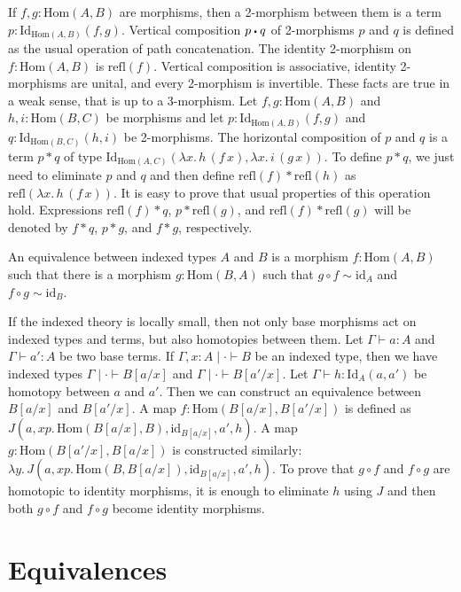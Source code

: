 \documentclass[reqno]{amsart}
\theoremstyle{definition}
\theoremstyle{remark}
\newcommand{\ob}{}
\newcommand{\fs}[1]{\mathrm{#1}}
\newcommand{\Hom}{\fs{Hom}}
\newcommand{\Id}{\fs{Id}}
\newcommand{\refl}{\fs{refl}}
\newcommand{\id}{\fs{id}}
\numberwithin{figure}{section}
\newcommand{\ct}{%
  \mathchoice{\mathbin{\raisebox{0.25ex}{$\displaystyle\centerdot$}}}%
             {\mathbin{\raisebox{0.25ex}{$\centerdot$}}}%
             {\mathbin{\raisebox{0.25ex}{$\scriptstyle\,\centerdot\,$}}}%
             {\mathbin{\raisebox{0.25ex}{$\scriptscriptstyle\,\centerdot\,$}}}
}
\begin{document}
If $f,g : \Hom(A,B)$ are morphisms, then a 2-morphism between them is a term $p : \Id_{\Hom(A,B)}(f,g)$.
Vertical composition $p \ct q$ of 2-morphisms $p$ and $q$ is defined as the usual operation of path concatenation.
The identity 2-morphism on $f : \Hom(A,B)$ is $\refl(f)$.
Vertical composition is associative, identity 2-morphisms are unital, and every 2-morphism is invertible.
These facts are true in a weak sense, that is up to a 3-morphism.
Let $f,g : \Hom(A,B)$ and $h,i : \Hom(B,C)$ be morphisms and let $p : \Id_{\Hom(A,B)}(f,g)$ and $q : \Id_{\Hom(B,C)}(h,i)$ be 2-morphisms.
The horizontal composition of $p$ and $q$ is a term $p * q$ of type $\Id_{\Hom(A,C)}(\lambda x.\,h\,(f\,x), \lambda x.\,i\,(g\,x))$.
To define $p * q$, we just need to eliminate $p$ and $q$ and then define $\refl(f) * \refl(h)$ as $\refl(\lambda x.\,h\,(f\,x))$.
It is easy to prove that usual properties of this operation hold.
Expressions $\refl(f) * q$, $p * \refl(g)$, and $\refl(f) * \refl(g)$ will be denoted by $f * q$, $p * g$, and $f * g$, respectively.

\begin{defn}
An equivalence between indexed types $A$ and $B$ is a morphism $f : \Hom(A,B)$ such that there is a morphism $g : \Hom(B,A)$ such that $g \circ f \sim \id_A$ and $f \circ g \sim \id_B$.
\end{defn}

If the indexed theory is locally small, then not only base morphisms act on indexed types and terms, but also homotopies between them.
Let $\Gamma \vdash a : A$ and $\Gamma \vdash a' : A$ be two base terms.
If $\Gamma, x : A \mid \cdot \vdash B \ob$ be an indexed type, then we have indexed types $\Gamma \mid \cdot \vdash B[a/x] \ob$ and $\Gamma \mid \cdot \vdash B[a'/x] \ob$.
Let $\Gamma \vdash h : \Id_A(a,a')$ be homotopy between $a$ and $a'$.
Then we can construct an equivalence between $B[a/x]$ and $B[a'/x]$.
A map $f : \Hom(B[a/x],B[a'/x])$ is defined as $J(a, x p.\,\Hom(B[a/x],B), \id_{B[a/x]}, a', h)$.
A map $g : \Hom(B[a'/x],B[a/x])$ is constructed similarly: $\lambda y.\,J(a, x p.\,\Hom(B,B[a/x]), \id_{B[a/x]}, a', h)$.
To prove that $g \circ f$ and $f \circ g$ are homotopic to identity morphisms, it is enough to eliminate $h$ using $J$ and then both $g \circ f$ and $f \circ g$ become identity morphisms.

\section{Equivalences}
\end{document}
